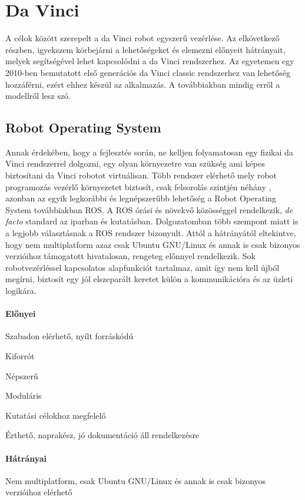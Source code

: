 \documentclass[12pt,a4paper,oneside]{report} %
\begin{document}
\section{Da Vinci}
\label{sec:davi}
A célok között szerepelt a da Vinci robot egyszerű vezérlése. 
Az elkövetkező részben, igyekszem körbejárni a lehetőségeket és elemezni előnyeit hátrányait, melyek segítségével lehet kapcsolódni a da Vinci rendszerhez. Az egyetemen egy 2010-ben bemutatott első generációs da Vinci classic rendszerhez van lehetőség hozzáférni, ezért ehhez készül az alkalmazás. A továbbiakban mindig erről a modellről lesz szó.
\subsection{Robot Operating System}
Annak érdekében, hogy a fejlesztés során, ne kelljen folyamatosan egy fizikai da Vinci rendszerrel dolgozni, egy olyan környezetre van szükség ami képes biztosítani da Vinci robotot virtuálisan. Több rendszer elérhető mely robot programozás vezérlő környezetet biztosít, csak felsorolás szintjén néhány \cite{BibEntry2020May, montemerlo2003perspectives}, azonban az egyik legkorábbi és legnépszerűbb lehetőség a Robot Operating System \cite{quigley2009ros} továbbiakban ROS. A ROS órási és növekvő közösséggel rendelkezik, \textit{de facto} standard az iparban és kutatásban. Dolgozatomban több szempont miatt is a legjobb választásnak a ROS rendszer bizonyult. Attól a hátrányától eltekintve, hogy nem multiplatform azaz csak Ubuntu GNU/Linux és annak is csak bizonyos verzióihoz támogatott hivatalosan, rengeteg előnnyel rendelkezik. Sok robotvezérléssel kapcsolatos alapfunkciót tartalmaz, amit így nem kell újból megírni, biztosít egy jól elszeparált keretet külön a kommunikációra és az üzleti logikára.
\paragraph{Előnyei} 
\begin{compactitem}
	\item Szabadon elérhető, nyílt forráskódú
	\item Kiforrót
	\item Népszerű
	\item Moduláris
	\item Kutatási célokhoz megfelelő
	\item Érthető, naprakész, jó dokumentáció áll rendelkezésre
\end{compactitem}
\paragraph{Hátrányai} 
\begin{compactitem}
	\item Nem multiplatform, csak Ubuntu GNU/Linux és annak is csak bizonyos verzióihoz elérhető
\end{compactitem}
\end{document}

